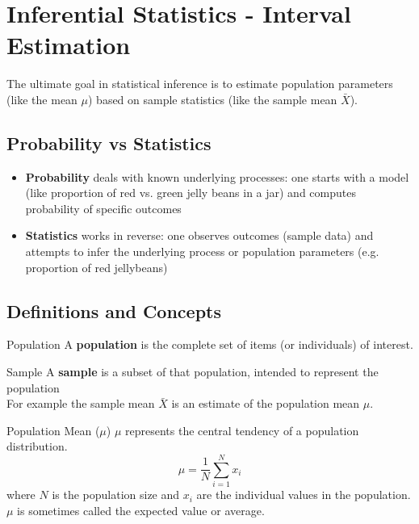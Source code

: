 \documentclass[10pt, total={6in, 8in}]{extarticle}
\begin{document}
\pagebreak

\scriptsize\tableofcontents\normalsize

\pagebreak

\section{Inferential Statistics - Interval Estimation}
The ultimate goal in statistical inference is to estimate population parameters (like the mean $\mu$) based on sample statistics (like the sample mean $\bar{X}$).
\subsection{Probability vs Statistics}
\begin{itemize}
    \item \textbf{Probability} deals with known underlying processes: one starts with a model (like proportion of red vs. green jelly beans in a jar) and computes probability of specific outcomes
    \item \textbf{Statistics} works in reverse: one observes outcomes (sample data) and attempts to infer the underlying process or population parameters (e.g. proportion of red jellybeans)
\end{itemize}
\subsection{Definitions and Concepts}

\begin{definitionbox}{Population}{}
    A \textbf{population} is the complete set of items (or individuals) of interest.
\end{definitionbox}

\begin{definitionbox}{Sample}{}
    A \textbf{sample} is a subset of that population, intended to represent the population\\

    For example the sample mean $\bar{X}$ is an estimate of the population mean $\mu$.
\end{definitionbox}

\begin{definitionbox}{Population Mean ($\mu$)}{}
    $\mu$ represents the central tendency of a population distribution.
    $$\mu = \frac{1}{N} \sum_{i=1}^{N} x_i$$
    where $N$ is the population size and $x_i$ are the individual values in the population.\\

    $\mu$ is sometimes called the expected value or average.
\end{definitionbox}
\end{document}
